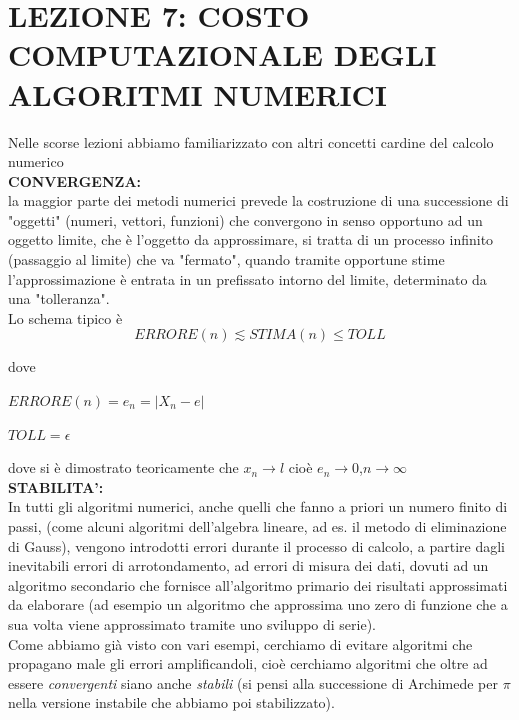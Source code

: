 \documentclass[12pt]{article}
\begin{document}
\section*{LEZIONE 7: COSTO COMPUTAZIONALE DEGLI ALGORITMI NUMERICI}
Nelle scorse lezioni abbiamo familiarizzato con altri concetti cardine del calcolo numerico\\
\textbf{CONVERGENZA:}\\
la maggior parte dei metodi numerici prevede la costruzione di una successione 
di "oggetti" (numeri, vettori, funzioni) che convergono in senso opportuno ad un oggetto limite, che è l'oggetto da approssimare, si tratta di un processo infinito (passaggio al limite) che va "fermato", 
quando tramite opportune stime l'approssimazione è entrata in un prefissato intorno del limite, determinato da una "tolleranza".\\
Lo schema tipico è 
\begin{equation}
    ERRORE(n) \lesssim STIMA(n) \leq TOLL
\end{equation}
\begin{center}
    dove
\end{center}
\begin{center}
    $ERRORE(n) = e_n = |X_n-e|$
\end{center}
\begin{center}
    $TOLL = \epsilon$
\end{center}
dove si è dimostrato teoricamente che $x_n\rightarrow l$ cioè $e_n\rightarrow0$,$n\rightarrow\infty$
\\
\textbf{STABILITA':}\\
In tutti gli algoritmi numerici, anche quelli che fanno a priori un numero finito di passi, (come alcuni algoritmi dell'algebra lineare, ad es. il metodo di eliminazione di Gauss), vengono introdotti errori durante il processo di calcolo, a partire dagli inevitabili errori di arrotondamento, ad errori di misura dei dati, dovuti ad un algoritmo secondario che fornisce all'algoritmo primario dei risultati approssimati da elaborare (ad esempio un algoritmo che approssima uno zero di funzione che a sua volta viene approssimato tramite uno sviluppo di serie).\\
Come abbiamo già visto con vari esempi, cerchiamo di evitare algoritmi che propagano male gli errori amplificandoli, cioè cerchiamo algoritmi che oltre ad essere \textit{convergenti} siano anche \textit{stabili} (si pensi alla successione di Archimede per $\pi$ nella versione instabile che abbiamo poi stabilizzato).\\
\end{document}
